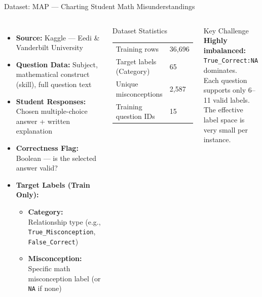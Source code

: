 \documentclass[aspectratio=169]{beamer}
\begin{document}
\begin{frame}{Dataset: MAP --- Charting Student Math Misunderstandings}
\begin{columns}[T]
\begin{itemize}
  \item \textbf{Source:} Kaggle --- Eedi \& Vanderbilt University
  \item \textbf{Question Data:} Subject, mathematical construct (skill), full question text
  \item \textbf{Student Responses:} Chosen multiple-choice answer + written explanation
  \item \textbf{Correctness Flag:} Boolean --- is the selected answer valid?
  \item \textbf{Target Labels (Train Only):}
  \begin{itemize}
    \item \textbf{Category:} Relationship type (e.g., \texttt{True\_Misconception}, \texttt{False\_Correct})
    \item \textbf{Misconception:} Specific math misconception label (or \texttt{NA} if none)
  \end{itemize}
\end{itemize}
\begin{block}{Dataset Statistics}
\begin{tabular}{ll}
Training rows & 36{,}696 \\
Target labels (Category) & 65 \\
Unique misconceptions & 2{,}587 \\
Training question IDs & 15 \\
\end{tabular}
\end{block}
\vspace{6pt}
\begin{alertblock}{Key Challenge}
\textbf{Highly imbalanced:}\\
\texttt{True\_Correct:NA} dominates.\\
Each question supports only 6--11 valid labels.\\
The effective label space is very small per instance.
\end{alertblock}
\end{columns}
\end{frame}
\end{document}
